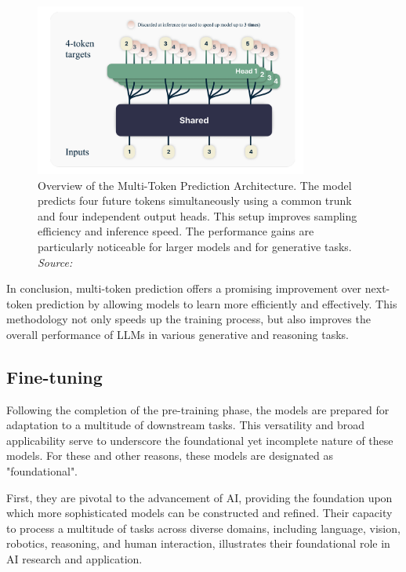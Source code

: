 \begin{figure}[h]
    \centering
    \includegraphics[width=0.8\textwidth]{images/llms/multi-token-pred-architecture.png}
    \caption{Overview of the Multi-Token Prediction Architecture. The model predicts four future tokens simultaneously using a common trunk and four independent output heads. This setup improves sampling efficiency and inference speed. The performance gains are particularly noticeable for larger models and for generative tasks. \textit{Source:} \cite{gloeckle2024better}}
    \label{fig:multi-token-prediction}
\end{figure}

In conclusion, multi-token prediction offers a promising improvement over next-token prediction by allowing models to learn more efficiently and effectively. This methodology not only speeds up the training process, but also improves the overall performance of LLMs in various generative and reasoning tasks.

\subsection{Fine-tuning}

Following the completion of the pre-training phase, the models are prepared for adaptation to a multitude of downstream tasks. This versatility and broad applicability serve to underscore the foundational yet incomplete nature of these models. For these and other reasons, these models are designated as "foundational".

First, they are pivotal to the advancement of AI, providing the foundation upon which more sophisticated models can be constructed and refined. Their capacity to process a multitude of tasks across diverse domains, including language, vision, robotics, reasoning, and human interaction, illustrates their foundational role in AI research and application.

